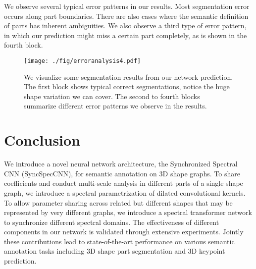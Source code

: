 \documentclass[10pt,twocolumn,letterpaper]{article}
\newcommand{\cmt}[2]{[#1: #2]}
\newcommand{\todo}[1]{\cmt{{\bf TODO}}{{\bf \color{blue} #1}}}
\begin{document}
We observe several typical error patterns in our results. Most segmentation error occurs along part boundaries. There are also cases where the semantic definition of parts has inherent ambiguities. We also observe a third type of error pattern, in which our prediction might miss a certain part completely, as is shown in the fourth block.

\begin{figure}
    \centering
    \texttt{[image: ./fig/erroranalysis4.pdf]}
    \caption{We visualize some segmentation results from our network prediction. The first block shows typical correct segmentations, notice the huge shape variation we can cover. The second to fourth blocks summarize different error patterns we observe in the results.}
    \label{fig:erroranalysis}
\end{figure}

\iffalse
\todo{
Compare different alternatives of our method
\begin{itemize}
    \item with multiple representatives instead of a single canonical space for spectral synchronization
    \item without join basis learning, visualize joint basis
    \item without dilated kernel, visualize dilated kernel
    \item different kernel choice: polynomial, cubic splines, exponential window, modulated exponential window
    \item different input vertex functions, extrinsic vertex functions help much since it's essentially a combination between extrinsic and intrinsic information for segmentation. intrinsic feature might not help much since the network is intrinsic and captures quite a lot intrinsic information already.
    \item network design, with/without skip link
\end{itemize}
}
\fi 


\section{Conclusion}
\label{sec:conclusion}
We introduce a novel neural network architecture, the Synchronized Spectral CNN (SyncSpecCNN), for semantic annotation on 3D shape graphs. To share coefficients and conduct multi-scale analysis in different parts of a single shape graph, we introduce a spectral parametrization of dilated convolutional kernels. To allow parameter sharing across related but different shapes that may be represented by very different graphs, we introduce a spectral transformer network to synchronize different spectral domains. The effectiveness of different components in our network is validated through extensive experiments. Jointly these contributions lead to state-of-the-art performance on various semantic annotation tasks including 3D shape part segmentation and 3D keypoint prediction. 

{\small


}
\end{document}
